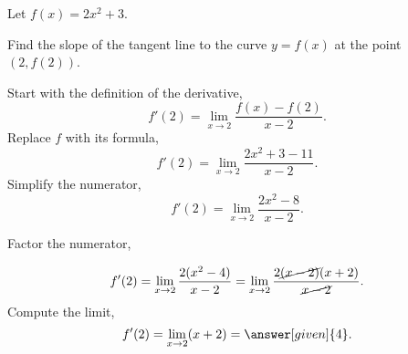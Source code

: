 \documentclass{ximera}
\begin{document}
\begin{example}
	Let $f(x) = 2x^2+3$.
	
	 Find the slope of the tangent line to the curve $y=f(x)$ at the point $(2,f(2))$.
			\begin{explanation}
		Start with the definition of the derivative,
		\[
 f'(2) = \lim_{x\to 2} \frac{f(x) - f(2)}{x-2}.
  \]
		Replace $f$ with its formula,
		\[
 f'(2) = \lim_{x\to 2} \frac{2x^2+3 - 11}{x-2}.
  \]
		Simplify the numerator,
				\[
 f'(2) = \lim_{x\to 2} \frac{2x^2-8}{x-2}.
  \]

		Factor the numerator,
			
				\[
 f'(2) = \lim_{x\to 2} \frac{2(x^2-4)}{x-2}=\lim_{x\to 2} \frac{2\cancel{(x-2)}(x+2)}{\cancel{x-2}}.
  \]
  Compute the limit,
			\[
 f'(2) =\lim_{x\to 2}(x+2)=\answer[given]{4}.
  \]

	\end{explanation}
	\end{example}
\end{document}
